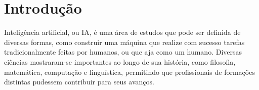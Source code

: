 
\chapter{Introdução}
\label{cap:introducao}

Inteligência artificial, ou IA, é uma área de estudos que pode ser definida de diversas formas, como construir uma máquina que realize com sucesso tarefas tradicionalmente feitas por humanos, ou que aja como um humano.
Diversas ciências mostraram-se importantes ao longo de sua história, como filosofia, matemática, computação e linguística, permitindo que profissionais de formações distintas pudessem contribuir para seus avanços.

